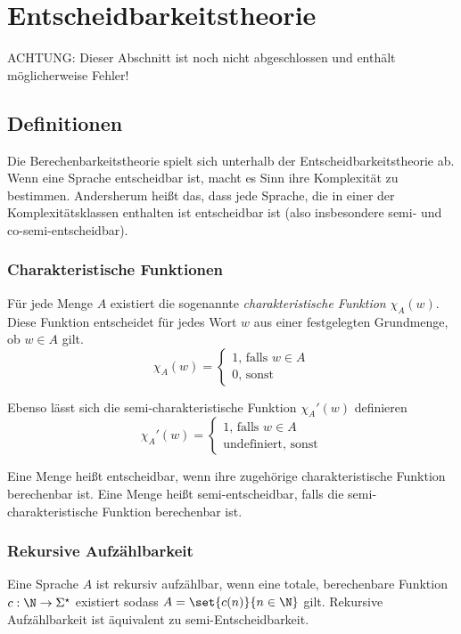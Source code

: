 \chapter{Entscheidbarkeitstheorie}
{\color{red}ACHTUNG: Dieser Abschnitt ist noch nicht abgeschlossen und enthält möglicherweise Fehler!}
\section{Definitionen}
Die Berechenbarkeitstheorie spielt sich unterhalb der Entscheidbarkeitstheorie ab. Wenn eine Sprache entscheidbar ist, macht es Sinn ihre Komplexität zu bestimmen. Andersherum heißt das, dass jede Sprache, die in einer der Komplexitätsklassen enthalten ist entscheidbar ist (also insbesondere semi- und co-semi-entscheidbar).

\subsection{Charakteristische Funktionen}
Für jede Menge $A$ existiert die sogenannte \emph{charakteristische Funktion} $\chi_A(w)$. Diese Funktion entscheidet für jedes Wort $w$ aus einer festgelegten Grundmenge, ob $w\in A$ gilt.
\begin{equation*}
	\chi_A(w)=\begin{cases}
		1\text{, falls } w\in A\\
		0\text{, sonst}
	\end{cases}
\end{equation*}

Ebenso lässt sich die semi-charakteristische Funktion $\chi_A'(w)$ definieren
\begin{equation*}
	\chi_A'(w)=\begin{cases}
		1\text{, falls } w\in A\\
		\mathrm{undefiniert}\text{, sonst}
	\end{cases}
\end{equation*}

Eine Menge heißt entscheidbar, wenn ihre zugehörige charakteristische Funktion berechenbar ist. Eine Menge heißt semi-entscheidbar, falls die semi-charakteristische Funktion berechenbar ist.

\subsection{Rekursive Aufzählbarkeit}
Eine Sprache $A$ ist rekursiv aufzählbar, wenn eine totale, berechenbare Funktion $c:\N\rightarrow\Sigma^\star$ existiert sodass $A=\set{c(n)}{n\in\N}$ gilt. Rekursive Aufzählbarkeit ist äquivalent zu semi-Entscheidbarkeit.

